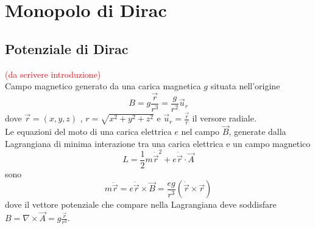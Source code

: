 \chapter{Monopolo di Dirac}
\section{Potenziale di Dirac}
%
\textcolor{red}{(da scrivere introduzione)}\\

Campo magnetico generato da una carica magnetica $g$ situata nell'origine
$$
   B = g \frac{\vec r}{r^3} = \frac{g}{r^2} \vec u _r
$$
dove $\vec r = (x,y,z)$ , $r = \sqrt{x^2 + y^2 + z^2}$ e $\vec u _r = \frac{\vec r}{r}$
il versore radiale.\\
Le equazioni del moto di una carica elettrica $e$ nel campo $\vec B$,
generate dalla Lagrangiana di minima interazione tra una carica elettrica e un campo
magnetico
$$
   L = \frac{1}{2} m \dot{\vec r} ^2 + e \dot{\vec r} \cdot \vec A
$$
sono
$$
   m \ddot{\vec r} = e\dot{\vec r} \times \vec B =
      \frac{eg}{r^3}(\dot{\vec r} \times \vec r)
$$
dove il vettore potenziale che compare nella Lagrangiana deve soddisfare
$B = \nabla \times \vec A = g \frac{\vec r}{r^3}$.\\

